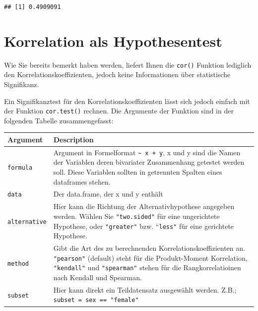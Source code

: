 \documentclass[
]{book}
\newcounter{none} %
\begin{document}
\begin{verbatim}
## [1] 0.4909091
\end{verbatim}

\section{Korrelation als Hypothesentest}\label{korrelation-als-hypothesentest}

Wie Sie bereits bemerkt haben werden, liefert Ihnen die \texttt{cor()} Funktion lediglich den Korrelationskoeffizienten, jedoch keine Informationen über statistische Signifikanz.

Ein Signifikanztest für den Korrelationskoeffizienten lässt sich jedoch einfach mit der Funktion \texttt{cor.test()} rechnen. Die Argumente der Funktion sind in der folgenden Tabelle zusammengefasst:

{\def\LTcaptype{none} %
\begin{longtable}[]{@{}
  >{\raggedright\arraybackslash}p{}
  >{\raggedright\arraybackslash}p{}@{}}
\toprule\noalign{}
\begin{minipage}[b]{\linewidth}\raggedright
Argument
\end{minipage} & \begin{minipage}[b]{\linewidth}\raggedright
Description
\end{minipage} \\
\midrule\noalign{}
\endhead
\bottomrule\noalign{}
\endlastfoot
\texttt{formula} & Argument in Formelformat \texttt{\textasciitilde{}\ x\ +\ y}, x und y sind die Namen der Variablen deren bivariater Zusammenhang getestet werden soll. Diese Variablen sollten in getrennten Spalten eines dataframes stehen. \\
\texttt{data} & Der data.frame, der x und y enthält \\
\texttt{alternative} & Hier kann die Richtung der Alternativhypothese angegeben werden. Wählen Sie \texttt{"two.sided"} für eine ungerichtete Hypothese, oder \texttt{"greater"} bzw. ``\texttt{less"} für eine gerichtete Hypothese. \\
\texttt{method} & Gibt die Art des zu berechnenden Korrelationskoeffizienten an. \texttt{"pearson"} (default) steht für die Produkt-Moment Korrelation, \texttt{"kendall"} und \texttt{"spearman"} stehen für die Rangkorrelatioinen nach Kendall und Spearman. \\
\texttt{subset} & Hier kann direkt ein Teildatensatz ausgewählt werden. Z.B.; \texttt{subset\ =\ sex\ ==\ "female"} \\
\end{longtable}
}
\end{document}
